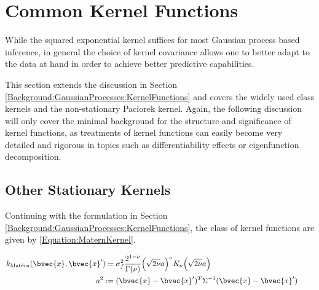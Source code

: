 \chapter{Common Kernel Functions}
\label{Appendix:CommonKernelFunctions}

	While the squared exponential kernel suffices for most Gaussian process based inference, in general the choice of kernel covariance allows one to better adapt to the data at hand in order to achieve better predictive capabilities.
	
	This section extends the discussion in Section \ref{Background:GaussianProcesses:KernelFunctions} and covers the widely used \matern class kernels and the non-stationary Paciorek kernel. Again, the following discussion will only cover the minimal background for the structure and significance of kernel functions, as treatments of kernel functions can easily become very detailed and rigorous in topics such as differentiability effects or eigenfunction decomposition.
	
	\section{Other Stationary Kernels}
	
				Continuing with the formulation in Section \ref{Background:GaussianProcesses:KernelFunctions}, the \matern class of kernel functions are given by \eqref{Equation:MaternKernel}.
				
				\begin{equation}
					\left.
						\begin{aligned}
							k_{\mathrm{\maternmath}}(\bvec{x}, \bvec{x}') =& \; \sigma_{f}^{2} \frac{2^{1 - \nu}}{\Gamma(\nu)} \Big( \sqrt{2 \nu} a \Big)^{\nu} K_{\nu}\Big( \sqrt{2 \nu} a \Big) \\
							a^{2} :=& \; (\bvec{x} - \bvec{x}')^{T} \Sigma^{-1} (\bvec{x} - \bvec{x}')
						\end{aligned}
					\qquad \right.
				\label{Equation:MaternKernel}
				\end{equation}
							
